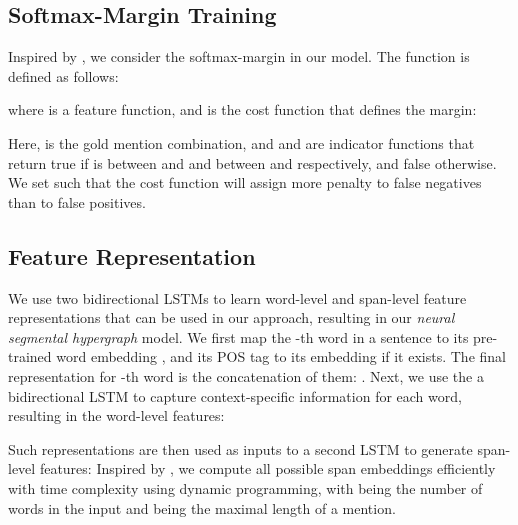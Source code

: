 \documentclass[11pt,a4paper]{article}
\theoremstyle{theorem}
\begin{document}
\subsection{Softmax-Margin Training}

Inspired by \cite{mohit2012recall}, we consider the softmax-margin \cite{gimpel-smith:2010:NAACLHLT} in our model.
The function  is defined as follows:
\begin{center}
\vspace{-3mm}
\small

\end{center}
where  is a feature function, and  is the cost function that defines the margin:
\begin{center}
\vspace{-3mm}
\small

\vspace{-3mm}
\end{center}


Here,  is the gold mention combination, and  and  are indicator functions that  return true if  is between  and  and between  and  respectively, and false otherwise. 
We set  such that the cost function will assign more penalty to false negatives than to false positives.


\subsection{Feature Representation}




We use two bidirectional LSTMs to learn word-level and span-level feature representations that can be used in our approach, resulting in our {\em neural segmental hypergraph} model.
We first map the -th word in a sentence to its pre-trained word embedding , and its POS tag to its embedding  if it exists.
The final representation for -{th} word is the concatenation of them: . 
Next, we  use the a bidirectional LSTM to capture context-specific information for each word,
resulting in the word-level features:
\begin{center}
\vspace{-3mm}
\small

\vspace{-3mm}
\end{center}

Such representations are then used as inputs to a second LSTM to generate span-level features:
Inspired by \cite{kong2015segmental}, we compute all possible span embeddings efficiently with time complexity  using dynamic programming, 
with  being the number of words in the input  and  being the maximal length of a mention.
\begin{center}
\vspace{-3mm}
\small

\vspace{-3mm}
\end{center}
\end{document}

